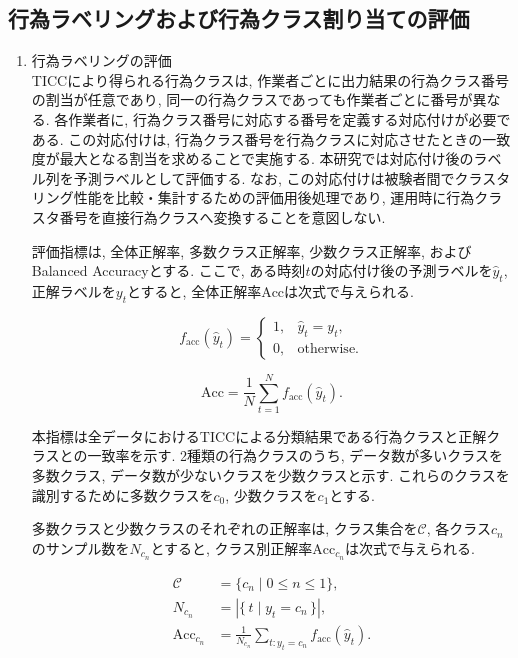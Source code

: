\documentclass[a4paper,12pt]{jreport}
\begin{document}
\subsection{行為ラベリングおよび行為クラス割り当ての評価}
\begin{enumerate}[label=(\arabic*)]
  \item 行為ラベリングの評価\\
  TICCにより得られる行為クラスは, 作業者ごとに出力結果の行為クラス番号の割当が任意であり, 同一の行為クラスであっても作業者ごとに番号が異なる. 各作業者に, 行為クラス番号に対応する番号を定義する対応付けが必要である.  この対応付けは, 行為クラス番号を行為クラスに対応させたときの一致度が最大となる割当を求めることで実施する. 本研究では対応付け後のラベル列を予測ラベルとして評価する.  なお, この対応付けは被験者間でクラスタリング性能を比較・集計するための評価用後処理であり, 運用時に行為クラスタ番号を直接行為クラスへ変換することを意図しない. 

  評価指標は, 全体正解率, 多数クラス正解率, 少数クラス正解率, およびBalanced Accuracyとする. ここで, ある時刻$t$の対応付け後の予測ラベルを$\hat{y}_t$, 正解ラベルを$y_t$とすると, 全体正解率$\mathrm{Acc}$は次式で与えられる.

\begin{equation}
f_{\mathrm{acc}}(\hat{y}_t)=
\begin{cases}
1, & \hat{y}_t=y_t,\\
0, & \text{otherwise}.
\end{cases}
\end{equation}

\begin{equation}
\mathrm{Acc}=\frac{1}{N}\sum_{t=1}^{N} f_{\mathrm{acc}}(\hat{y}_t).
\end{equation}

本指標は全データにおけるTICCによる分類結果である行為クラスと正解クラスとの一致率を示す.
2種類の行為クラスのうち, データ数が多いクラスを多数クラス, データ数が少ないクラスを少数クラスと示す. これらのクラスを識別するために多数クラスを$c_0$, 少数クラスを$c_1$とする.

多数クラスと少数クラスのそれぞれの正解率は, クラス集合を$\mathcal{C}$, 各クラス$c_n$のサンプル数を$N_{c_n}$とすると, クラス別正解率$\mathrm{Acc}_{c_n}$は次式で与えられる.

\begin{align}
\mathcal{C} &= \{c_n \mid 0 \le n \le 1\},\\
N_{c_n} &= \left|\{\,t \mid y_t=c_n\,\}\right|,\\
\mathrm{Acc}_{c_n} &= \frac{1}{N_{c_n}}\sum_{t: y_t=c_n} f_{\mathrm{acc}}(\hat{y}_t).
\end{align}


\end{enumerate}
\end{document}
